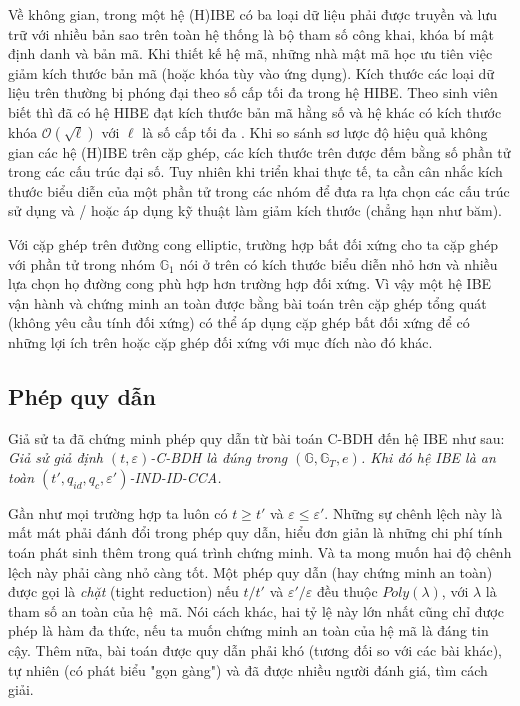 \documentclass[class=report, crop=false]{standalone}
\begin{document}
			Về không gian, trong một hệ (H)IBE có ba loại dữ liệu phải được truyền và lưu trữ với nhiều bản sao trên toàn hệ thống là bộ tham số công khai, khóa bí mật định danh và bản mã. Khi thiết kế hệ mã, những nhà mật mã học ưu tiên việc giảm kích thước bản mã (hoặc khóa tùy vào ứng dụng). Kích thước các loại dữ liệu trên thường bị phóng đại theo số cấp tối đa trong hệ HIBE. Theo sinh viên biết thì đã có hệ HIBE đạt kích thước bản mã hằng số và hệ khác có kích thước khóa $\mathcal{O}(\sqrt{\ell})$ với $\ell$ là số cấp tối đa \cite{DBLP:conf/eurocrypt/BonehBG05}. Khi so sánh sơ lược độ hiệu quả không gian các hệ (H)IBE trên cặp ghép, các kích thước trên được đếm bằng số phần tử trong các cấu trúc đại số. Tuy nhiên khi triển khai thực tế, ta cần cân nhắc kích thước biểu diễn của một phần tử trong các nhóm để đưa ra lựa chọn các cấu trúc sử dụng và / hoặc áp dụng kỹ thuật làm giảm kích thước (chẳng hạn như băm).

			Với cặp ghép trên đường cong elliptic, trường hợp bất đối xứng cho ta cặp ghép với phần tử trong nhóm $\mathbb{G}_1$ nói ở trên có kích thước biểu diễn nhỏ hơn và nhiều lựa chọn họ đường cong phù hợp hơn trường hợp đối xứng. Vì vậy một hệ IBE vận hành và chứng minh an toàn được bằng bài toán trên cặp ghép tổng quát (không yêu cầu tính đối xứng) có thể áp dụng cặp ghép bất đối xứng để có những lợi ích trên hoặc cặp ghép đối xứng với mục đích nào đó khác.
		\subsection{Phép quy dẫn}
			Giả sử ta đã chứng minh phép quy dẫn từ bài toán C-BDH đến hệ IBE \scheme như sau: \\[0.5\baselineskip] \indent
			\textit{
				Giả sử giả định $(t, \varepsilon)$-C-BDH là đúng trong $(\mathbb{G}, \mathbb{G}_T, e)$. Khi đó hệ IBE \scheme là an toàn $(t', q_{id}, q_c, \varepsilon')$-IND-ID-CCA.
			}
			
			Gần như mọi trường hợp ta luôn có $t \geq t'$ và $\varepsilon \leq \varepsilon'$. Những sự chênh lệch này là mất mát phải đánh đổi trong phép quy dẫn, hiểu đơn giản là những chi phí tính toán phát sinh thêm trong quá trình chứng minh. Và ta mong muốn hai độ chênh lệch này phải càng nhỏ càng tốt. Một phép quy dẫn (hay chứng minh an toàn) được gọi là \textit{chặt} (tight reduction) nếu $t / t'$ và $\varepsilon' / \varepsilon$ đều thuộc $Poly(\lambda)$, với $\lambda$ là tham số an toàn của hệ~mã. Nói cách khác, hai tỷ lệ này lớn nhất cũng chỉ được phép là hàm đa thức, nếu ta muốn chứng minh an toàn của hệ mã là đáng tin cậy. Thêm nữa, bài toán được quy dẫn phải khó (tương đối so với các bài khác), tự nhiên (có phát biểu "gọn gàng") và đã được nhiều người đánh giá, tìm cách giải.
\end{document}
